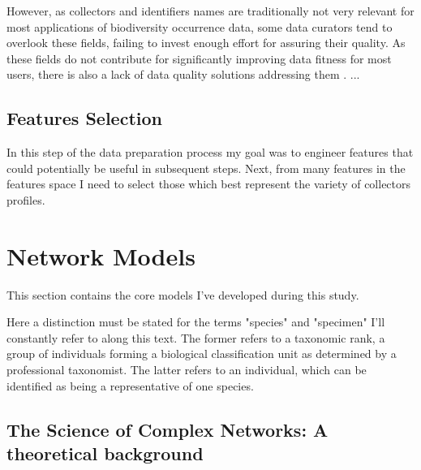 \documentclass[a4paper]{article}
\begin{document}
However, as collectors and identifiers names are traditionally not very relevant for most applications of biodiversity occurrence data, some data curators tend to overlook these fields, failing to invest enough effort for assuring their quality. As these fields do not contribute for significantly improving data fitness for most users, there is also a lack of data quality solutions addressing them \cite{KochVeiga2017}.
...





\subsection{Features Selection}
In this step of the data preparation process my goal was to engineer features that could potentially be useful in subsequent steps. Next, from many features in the features space I need to select those which best represent the variety of collectors profiles.

\section{Network Models}

This section contains the core models I've developed during this study.

Here a distinction must be stated for the terms "species" and "specimen" I'll constantly refer to along this text. The former refers to a taxonomic rank, a group of individuals forming a biological classification unit as determined by a professional taxonomist. The latter refers to an individual, which can be identified as being a representative of one species.

\subsection{The Science of Complex Networks: A theoretical background}
\end{document}
